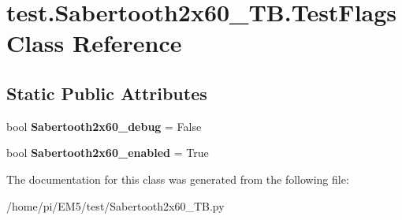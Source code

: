 \hypertarget{classtest_1_1Sabertooth2x60__TB_1_1TestFlags}{}\section{test.\+Sabertooth2x60\+\_\+\+T\+B.\+Test\+Flags Class Reference}
\label{classtest_1_1Sabertooth2x60__TB_1_1TestFlags}
\subsection*{Static Public Attributes}
\begin{DoxyCompactItemize}
\item 
\mbox{\label{classtest_1_1Sabertooth2x60__TB_1_1TestFlags_a49c3aef0bfe081b95a508275ebdca58c}} 
bool {\bfseries Sabertooth2x60\+\_\+debug} = False
\item 
\mbox{\label{classtest_1_1Sabertooth2x60__TB_1_1TestFlags_a548e9b4cd42ade2c1d1815395f1c36e8}} 
bool {\bfseries Sabertooth2x60\+\_\+enabled} = True
\end{DoxyCompactItemize}


The documentation for this class was generated from the following file\+:\begin{DoxyCompactItemize}
\item 
/home/pi/\+E\+M5/test/Sabertooth2x60\+\_\+\+T\+B.\+py\end{DoxyCompactItemize}
